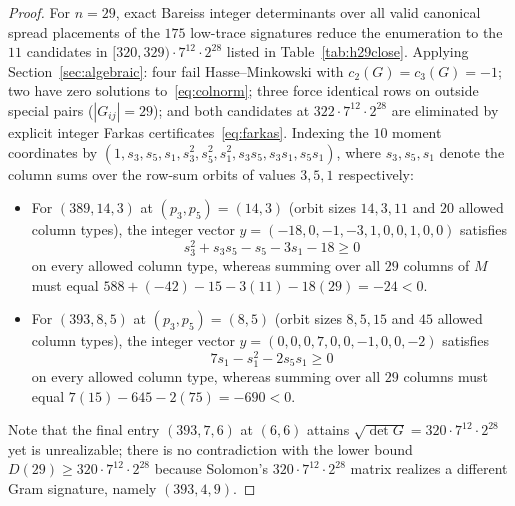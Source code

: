 \documentclass[11pt]{article}
\theoremstyle{remark}
\begin{document}
\begin{proof}
For $n = 29$, exact Bareiss integer determinants over all valid canonical spread placements of the $175$ low-trace signatures reduce the enumeration to the $11$ candidates in $[320, 329) \cdot 7^{12} \cdot 2^{28}$ listed in Table~\ref{tab:h29close}. Applying Section~\ref{sec:algebraic}: four fail Hasse--Minkowski with $c_2(G) = c_3(G) = -1$; two have zero solutions to~\eqref{eq:colnorm}; three force identical rows on outside special pairs ($|G_{ij}| = 29$); and both candidates at $322 \cdot 7^{12} \cdot 2^{28}$ are eliminated by explicit integer Farkas certificates~\eqref{eq:farkas}. Indexing the $10$ moment coordinates by $(1, s_3, s_5, s_1, s_3^2, s_5^2, s_1^2, s_3 s_5, s_3 s_1, s_5 s_1)$, where $s_3, s_5, s_1$ denote the column sums over the row-sum orbits of values $3, 5, 1$ respectively:
\begin{itemize}[leftmargin=*,topsep=1pt,itemsep=1pt]
\item For $(389, 14, 3)$ at $(p_3, p_5) = (14, 3)$ (orbit sizes $14, 3, 11$ and $20$ allowed column types), the integer vector $y = (-18, 0, -1, -3, 1, 0, 0, 1, 0, 0)$ satisfies
\[
  s_3^2 + s_3 s_5 - s_5 - 3 s_1 - 18 \ge 0
\]
on every allowed column type, whereas summing over all $29$ columns of $M$ must equal $588 + (-42) - 15 - 3(11) - 18(29) = -24 < 0$.
\item For $(393, 8, 5)$ at $(p_3, p_5) = (8, 5)$ (orbit sizes $8, 5, 15$ and $45$ allowed column types), the integer vector $y = (0, 0, 0, 7, 0, 0, -1, 0, 0, -2)$ satisfies
\[
  7 s_1 - s_1^2 - 2 s_5 s_1 \ge 0
\]
on every allowed column type, whereas summing over all $29$ columns must equal $7(15) - 645 - 2(75) = -690 < 0$.
\end{itemize}
Note that the final entry $(393, 7, 6)$ at $(6, 6)$ attains $\sqrt{\det G} = 320 \cdot 7^{12} \cdot 2^{28}$ yet is unrealizable; there is no contradiction with the lower bound $D(29) \ge 320 \cdot 7^{12} \cdot 2^{28}$ because Solomon's $320 \cdot 7^{12} \cdot 2^{28}$ matrix realizes a different Gram signature, namely $(393, 4, 9)$.


\end{proof}
\end{document}
